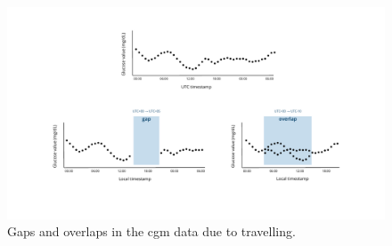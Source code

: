\documentclass[11pt,a4paper]{article}
\begin{document}
\begin{enumerate}[label=\textbf{\arabic*}.]
\begin{enumerate}
    \begin{figure}[h!]
        \centering
        \caption{Gaps and overlaps in the \gls{cgm} data due to travelling.}
        \label{fig:gaps-overlaps}
        \includegraphics[width=.8\textwidth, trim=3cm 2.5cm 3cm 1.5cm, clip]{figure/gaps_overlaps.pdf}
    \end{figure}
    

\end{enumerate}
\end{enumerate}
\end{document}
